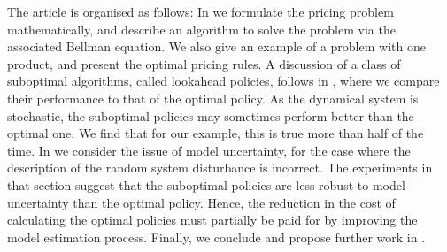 \documentclass[main.tex]{subfiles}
\begin{document}
The article is organised as follows:
In  we formulate the
pricing problem mathematically, and describe an algorithm to solve the
problem via the associated Bellman equation. We also give an example
of a problem with one product, and present the optimal pricing rules.
A discussion of a class of suboptimal
algorithms, called lookahead policies, follows in
, where we compare their
performance to that of
the optimal policy. As the dynamical system is stochastic, the
suboptimal policies may sometimes perform better than the optimal
one. We find that for our example, this is  true more than half of
the time.
In  we consider the issue of
model uncertainty, for the case where the description of the random system
disturbance is incorrect. The experiments in that section suggest
that the suboptimal policies are less robust to model uncertainty
than the optimal policy. Hence, the reduction in the cost
of calculating the optimal policies must partially be paid for
by improving the model estimation process.
Finally, we conclude and propose further work in .

\biblio
\end{document}

